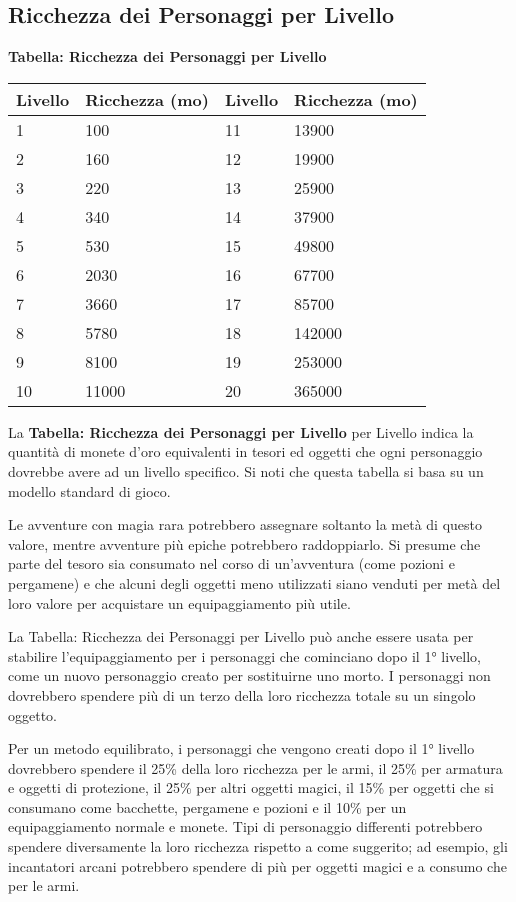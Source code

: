\begin{multicols}{2}
\subsection{Ricchezza dei Personaggi per Livello}

\textbf{Tabella: Ricchezza dei Personaggi per Livello}

\medskip

\noindent\begin{tabularx}{0.50\textwidth}{XX|XX}
	\toprule
\textbf{Livello} & \textbf{Ricchezza (mo)} & \textbf{Livello} & \textbf{Ricchezza (mo)}\\
\toprule
1 & 100 & 11 & 13900\\
2 & 160 & 12 & 19900\\
3 & 220 & 13 & 25900\\
4 & 340 & 14 & 37900\\
5 & 530 & 15 & 49800\\
6 & 2030 & 16 & 67700\\
7 & 3660 & 17 & 85700\\
8 & 5780 & 18 & 142000\\
9 & 8100 & 19 & 253000\\
10 & 11000 & 20 & 365000
\end{tabularx}

\medskip

La \textbf{Tabella: Ricchezza dei Personaggi per Livello} per Livello indica la quantità di monete d'oro equivalenti in tesori ed oggetti che ogni personaggio dovrebbe avere ad un livello specifico. Si noti che questa tabella si basa su un modello standard di gioco.

Le avventure con magia rara potrebbero assegnare soltanto la metà di questo valore, mentre avventure più epiche potrebbero raddoppiarlo. Si presume che parte del tesoro sia consumato nel corso di un'avventura (come pozioni e pergamene) e che alcuni degli oggetti meno utilizzati siano venduti per metà del loro valore per acquistare un equipaggiamento più utile.

La Tabella: Ricchezza dei Personaggi per Livello può anche essere usata per stabilire l'equipaggiamento per i personaggi che cominciano dopo il 1° livello, come un nuovo personaggio creato per sostituirne uno morto. I personaggi non dovrebbero spendere più di un terzo della loro ricchezza totale su un singolo oggetto.

Per un metodo equilibrato, i personaggi che vengono creati dopo il 1° livello dovrebbero spendere il 25\% della loro ricchezza per le armi, il 25\% per armatura e oggetti di protezione, il 25\% per altri oggetti magici, il 15\% per oggetti che si consumano come bacchette, pergamene e pozioni e il 10\% per un equipaggiamento normale e monete. Tipi di personaggio differenti potrebbero spendere diversamente la loro ricchezza rispetto a come suggerito; ad esempio, gli incantatori arcani potrebbero spendere di più per oggetti magici e a consumo che per le armi.


\end{multicols}
